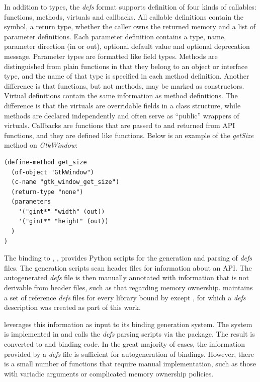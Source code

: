 \documentclass[article]{jss}
\begin{document}
In addition to types, the \emph{defs} format supports definition of four kinds
of callables: functions, methods, virtuals and callbacks. All callable definitions
contain the  symbol, a return type, whether the caller
owns the returned memory and a list of 
parameter definitions. Each parameter definition contains a 
type, name, parameter direction (in or out), optional default value and optional
deprecation message. Parameter types are formatted like field types. Methods 
are distinguished from plain functions in that they belong to an object or 
interface type, and the name of that type is specified in each method definition.
Another difference is that functions, but not methods, may be marked as constructors.
Virtual definitions contain the same information as method definitions. The difference
is that the virtuals are overridable fields in a class structure, while methods are
declared independently and often serve as ``public'' wrappers of virtuals.
Callbacks are functions that are passed to and returned from API functions, 
and they are defined like functions. Below is an example of the \emph{getSize}
method on \emph{GtkWindow}:
\begin{verbatim}
(define-method get_size
  (of-object "GtkWindow")
  (c-name "gtk_window_get_size")
  (return-type "none")
  (parameters
    '("gint*" "width" (out))
    '("gint*" "height" (out))
  )
)
\end{verbatim}

The  binding to ,
 \citep{PyGTK}, provides Python scripts for the generation and 
parsing of \emph{defs} files. The generation scripts scan  header 
files for information about an API. The autogenerated \emph{defs} file is then 
manually annotated with information that is not derivable from header files, such as that
regarding memory ownership.  maintains a set of reference \emph{defs} files
for every library bound by  except , for which a \emph{defs}
description was created as part of this work.

 leverages this information as input to its binding generation system.
The system is implemented in  and calls the  \emph{defs}
parsing scripts via the  \citep{RSPython} package.
The result is converted to  and  binding code. In the 
great majority of cases, the information
provided by a \emph{defs} file is sufficient for autogeneration of bindings. 
However, there is a small number of functions that require manual implementation,
such as those with variadic arguments or complicated memory ownership policies.
\end{document}
